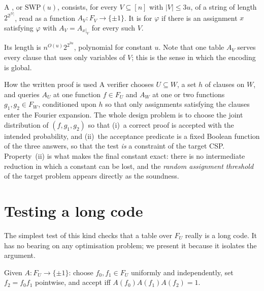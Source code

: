 \begin{definition}\label{def:swp}
A , or $\mathrm{SWP}(u)$, consists, for every $V\subseteq[n]$ with $|V|\le3u$, of a string of length $2^{2^{|V|}}$, read as a function $A_V\colon F_V\to\{\pm1\}$.
It is  for $\varphi$ if there is an assignment $x$ satisfying $\varphi$ with $A_V=A_{x|_V}$ for every such $V$.
\end{definition}

\noindent
Its length is $n^{O(u)}2^{2^{3u}}$, polynomial for constant $u$.  Note that one table $A_V$ serves every clause that uses only variables of $V$; this is the sense in which the encoding is global.

\begin{bigpicture}{How the written proof is used}
A verifier chooses $U\subseteq W$, a set $h$ of clauses on $W$, and queries $A_U$ at one function $f\in F_U$ and $A_W$ at one or two functions $g_1,g_2\in F_W$, conditioned upon $h$ so that only assignments satisfying the clauses enter the Fourier expansion.
The whole design problem is to choose the joint distribution of $(f,g_1,g_2)$ so that (i)~a correct proof is accepted with the intended probability, and (ii)~the acceptance predicate is a fixed Boolean function of the three answers, so that the test \emph{is} a constraint of the target CSP.
Property~(ii) is what makes the final constant exact: there is no intermediate reduction in which a constant can be lost, and the \emph{random assignment threshold} of the target problem appears directly as the soundness.
\end{bigpicture}


\section{Testing a long code}
\label{sec:lctest}

The simplest test of this kind checks that a table over $F_U$ really is a long code.  It has no bearing on any optimisation problem; we present it because it isolates the argument.

\begin{definition}\label{def:lctest}
Given $A\colon F_U\to\{\pm1\}$: choose $f_0,f_1\in F_U$ uniformly and independently, set $f_2=f_0f_1$ pointwise, and accept iff $A(f_0)A(f_1)A(f_2)=1$.
\end{definition}

